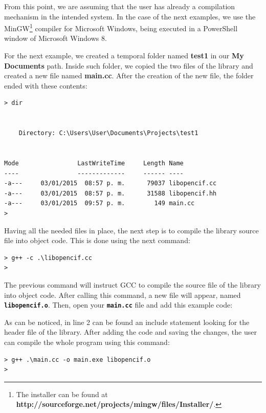 \documentclass[11pt,twoside,openany,x11names,svgnames]{memoir}
\begin{document}
From this point, we are assuming that the user has already a compilation mechanism in the intended system. In the case of the next examples, we use the MinGW\footnote{The installer can be found at \textbf{http://sourceforge.net/projects/mingw/files/Installer/}.} compiler for Microsoft Windows, being executed in a PowerShell window of Microsoft Windows 8.

For the next example, we created a temporal folder named \textbf{test1} in our \textbf{My Documents} path. Inside such folder, we copied the two files of the library and created a new file named \textbf{main.cc}. After the creation of the new file, the folder ended with these contents:

\begin{lstlisting}[frame=single,style=SystemCommandStyle]
> dir


    Directory: C:\Users\User\Documents\Projects\test1


Mode                LastWriteTime     Length Name
----                -------------     ------ ----
-a---     03/01/2015  08:57 p. m.      79037 libopencif.cc
-a---     03/01/2015  08:57 p. m.      31588 libopencif.hh
-a---     03/01/2015  09:57 p. m.        149 main.cc
>
\end{lstlisting}

Having all the needed files in place, the next step is to compile the library source file into object code. This is done using the next command:

\begin{lstlisting}[frame=single,style=SystemCommandStyle]
> g++ -c .\libopencif.cc
>
\end{lstlisting}

The previous command will instruct GCC to compile the source file of the library into object code. After calling this command, a new file will appear, named \textbf{\texttt{libopencif.o}}. Then, open your \textbf{\texttt{main.cc}} file and add this example code:



As can be noticed, in line 2 can be found an include statement looking for the header file of the library. After adding the code and saving the changes, the user can compile the whole program using this command:

\begin{lstlisting}[frame=single,style=SystemCommandStyle]
> g++ .\main.cc -o main.exe libopencif.o
>
\end{lstlisting}
\end{document}
